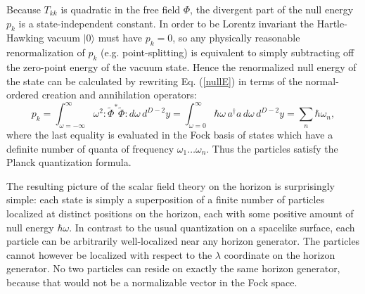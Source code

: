 \documentclass{article}
\begin{document}
Because $T_{kk}$ is quadratic in the free field $\Phi$, the divergent part of the null energy $p_k$ is a state-independent constant.  In order to be Lorentz invariant the Hartle-Hawking vacuum $|0\rangle$ must have $p_k = 0$, so any physically reasonable renormalization of
$p_k$ (e.g. point-splitting) is equivalent to simply subtracting off the zero-point energy of the vacuum state.  Hence the renormalized null energy of the state can be calculated by rewriting Eq. (\ref{nullE}) in terms of the normal-ordered creation and annihilation operators:
\begin{equation}
p_k =
\int^{\infty}_{\omega=-\infty} \!\!\!\!\!\! \omega^2 \!:\!\tilde{\Phi}^*\tilde{\Phi}\!: d\omega\,d^{D-2}y
= \int^{\infty}_{\omega=0} \hbar\omega\,a^{\dagger}a\,d\omega\,d^{D-2}y
= \sum_n \hbar \omega_n,
\end{equation}
where the last equality is evaluated in the Fock basis of states which have a definite number of quanta of frequency $\omega_1 \ldots \omega_n$.  Thus the particles satisfy the Planck quantization formula.

The resulting picture of the scalar field theory on the horizon is surprisingly simple: each state is simply a superposition of a finite number of particles localized at distinct positions on the horizon, each with some positive amount of null energy $\hbar \omega$.  In contrast to the usual quantization on a spacelike surface, each particle can be arbitrarily well-localized near any horizon generator.  The particles cannot however be localized with respect to the $\lambda$ coordinate on the horizon generator.  No two particles can reside on exactly the same horizon generator, because that would not be a normalizable vector in the Fock space.
\end{document}
